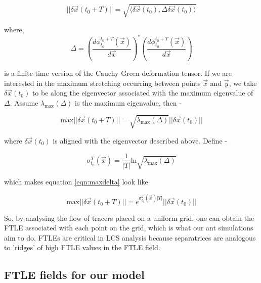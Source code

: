\begin{equation}
    ||\delta\vec{x}(t_0 + T)|| = \sqrt{\langle \delta\vec{x}(t_0) , \Delta \delta\vec{x}(t_0) \rangle}
\end{equation}

where, 
\begin{equation}
    \Delta = \left(\frac{d\phi^{t_0 + T}_{t_0}(\vec{x})}{d\vec{x}}\right)^*\left(\frac{d\phi^{t_0 + T}_{t_0}(\vec{x})}{d\vec{x}}\right)
\end{equation}

is a finite-time version of the Cauchy-Green deformation tensor. If we are interested in the maximum stretching occurring between points $\vec{x}$ and $\vec{y}$, we take $\delta \vec{x}(t_0)$ to be along the eigenvector associated with the maximum eigenvalue of $\Delta$. Assume $\lambda_{\text{max}}(\Delta)$ is the maximum eigenvalue, then -

\begin{equation}
    \text{max}||\delta\vec{x}(t_0 + T)|| = \sqrt{\lambda_{\text{max}}(\Delta)}||\delta\vec{x}(t_0)||
    \label{eqn:maxdelta}
\end{equation}

where $\delta\vec{x}(t_0)$ is aligned with the eigenvector described above. Define -

\begin{equation}
    \sigma_{t_0}^T(\vec{x}) = \frac{1}{|T|}\text{ln}\sqrt{\lambda_{\text{max}}(\Delta)}
\end{equation}

which makes equation \ref{eqn:maxdelta} look like 

\begin{equation}
    \text{max}||\delta\vec{x}(t_0 + T)|| = e^{\sigma_{t_0}^T(\vec{x})|T|}||\delta\vec{x}(t_0)||
\end{equation}

So, by analysing the flow of tracers placed on a uniform grid, one can obtain the FTLE associated with each point on the grid, which is what our ant simulations aim to do. FTLEs are critical in LCS analysis because separatrices are analogous to 'ridges' of high FTLE values in the FTLE field.

\subsection{FTLE fields for our model}

